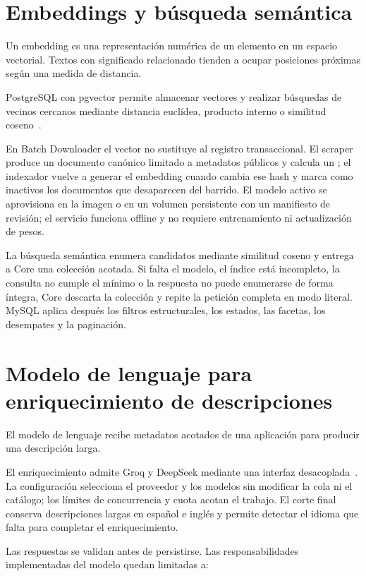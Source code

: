 \section{Embeddings y búsqueda semántica}

Un embedding es una representación numérica de un elemento en un espacio vectorial. Textos con significado relacionado tienden a ocupar posiciones próximas según una medida de distancia.

PostgreSQL con pgvector permite almacenar vectores y realizar búsquedas de vecinos cercanos mediante distancia euclídea, producto interno o similitud coseno~\cite{pgvector}.

En Batch Downloader el vector no sustituye al registro transaccional. El scraper produce un documento canónico limitado a metadatos públicos y calcula un ; el indexador vuelve a generar el embedding cuando cambia ese hash y marca como inactivos los documentos que desaparecen del barrido. El modelo activo se aprovisiona en la imagen o en un volumen persistente con un manifiesto de revisión; el servicio funciona offline y no requiere entrenamiento ni actualización de pesos.

La búsqueda semántica enumera candidatos mediante similitud coseno y entrega a Core una colección acotada. Si falta el modelo, el índice está incompleto, la consulta no cumple el mínimo o la respuesta no puede enumerarse de forma íntegra, Core descarta la colección y repite la petición completa en modo literal. MySQL aplica después los filtros estructurales, los estados, las facetas, los desempates y la paginación.

\section{Modelo de lenguaje para enriquecimiento de descripciones}

El modelo de lenguaje recibe metadatos acotados de una aplicación para producir una descripción larga.

El enriquecimiento admite Groq y DeepSeek mediante una interfaz desacoplada~\cite{groq}. La configuración selecciona el proveedor y los modelos sin modificar la cola ni el catálogo; los límites de concurrencia y cuota acotan el trabajo. El corte final conserva descripciones largas en español e inglés y permite detectar el idioma que falta para completar el enriquecimiento.

Las respuestas se validan antes de persistirse. Las responsabilidades implementadas del modelo quedan limitadas a:

